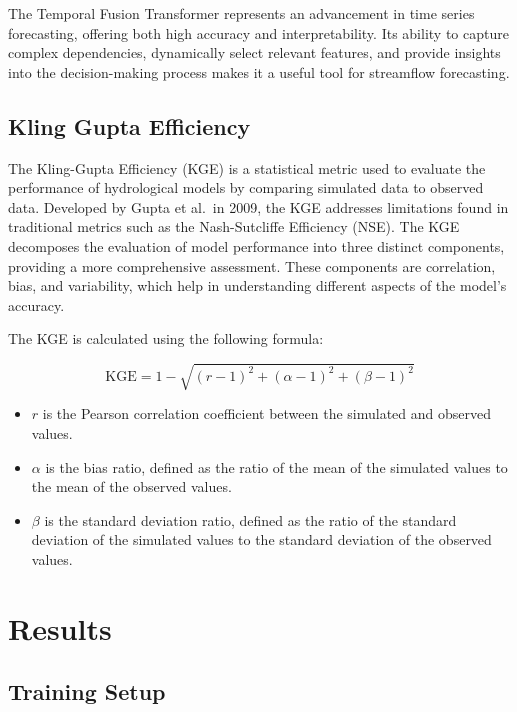 \documentclass[
]{krantz}
\begin{document}
The Temporal Fusion Transformer represents an advancement in time series forecasting, offering both high accuracy and interpretability. Its ability to capture complex dependencies, dynamically select relevant features, and provide insights into the decision-making process makes it a useful tool for streamflow forecasting.

\subsection{Kling Gupta Efficiency}\label{kling-gupta-efficiency}

The Kling-Gupta Efficiency (KGE) is a statistical metric used to evaluate the performance of hydrological models by comparing simulated data to observed data. Developed by Gupta et al.~in 2009, the KGE addresses limitations found in traditional metrics such as the Nash-Sutcliffe Efficiency (NSE). The KGE decomposes the evaluation of model performance into three distinct components, providing a more comprehensive assessment. These components are correlation, bias, and variability, which help in understanding different aspects of the model's accuracy.

The KGE is calculated using the following formula:

\[ \text{KGE} = 1 - \sqrt{(r - 1)^2 + (\alpha - 1)^2 + (\beta - 1)^2} \tag{2} \]

\begin{itemize}
\item
  \(r\) is the Pearson correlation coefficient between the simulated and observed values.
\item
  \(\alpha\) is the bias ratio, defined as the ratio of the mean of the simulated values to the mean of the observed values.
\item
  \(\beta\) is the standard deviation ratio, defined as the ratio of the standard deviation of the simulated values to the standard deviation of the observed values.
\end{itemize}

\section{Results}\label{results-1}

\subsection{Training Setup}\label{training-setup}
\end{document}
